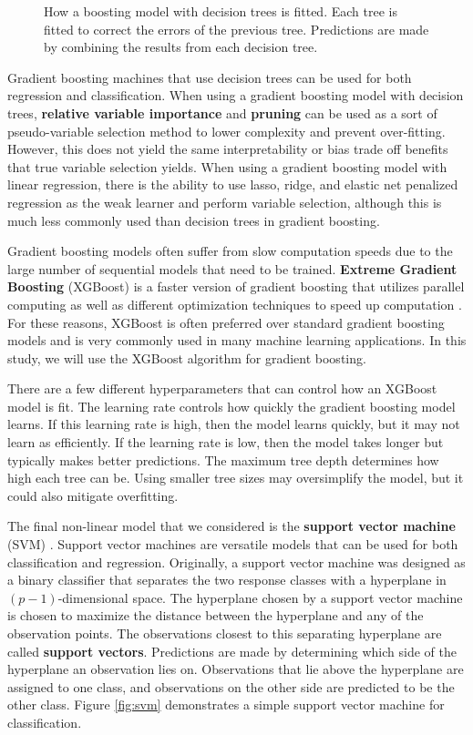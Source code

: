 \documentclass{article}
\begin{document}
\begin{figure}[b!]
	\footnotesize
	\centering
	
	\captionsetup{width = 0.8\textwidth}
	\caption{How a boosting model with decision trees is fitted. Each tree is fitted to correct the errors of the previous tree. Predictions are made by combining the results from each decision tree.}
	\label{fig:boosting}
\end{figure}

Gradient boosting machines that use decision trees can be used for both regression and classification. When using a gradient boosting model with decision trees, \textbf{relative variable importance} and \textbf{pruning} can be used as a sort of pseudo-variable selection method to lower complexity and prevent over-fitting. However, this does not yield the same interpretability or bias trade off benefits that true variable selection yields. When using a gradient boosting model with linear regression, there is the ability to use lasso, ridge, and elastic net penalized regression as the weak learner and perform variable selection, although this is much less commonly used than decision trees in gradient boosting.

Gradient boosting models often suffer from slow computation speeds due to the large number of sequential models that need to be trained. \textbf{Extreme Gradient Boosting} (XGBoost) is a faster version of gradient boosting that utilizes parallel computing as well as different optimization techniques to speed up computation \cite{chen2016xgboost}. For these reasons, XGBoost is often preferred over standard gradient boosting models and is very commonly used in many machine learning applications. In this study, we will use the XGBoost algorithm for gradient boosting.

There are a few different hyperparameters that can control how an XGBoost model is fit. The learning rate controls how quickly the gradient boosting model learns. If this learning rate is high, then the model learns quickly, but it may not learn as efficiently. If the learning rate is low, then the model takes longer but typically makes better predictions. The maximum tree depth determines how high each tree can be. Using smaller tree sizes may oversimplify the model, but it could also mitigate overfitting.

The final non-linear model that we considered is the \textbf{support vector machine} (SVM) \cite{cortes1995support}. Support vector machines are versatile models that can be used for both classification and regression. Originally, a support vector machine was designed as a binary classifier that separates the two response classes with a hyperplane in $(p - 1)$-dimensional space. The hyperplane chosen by a support vector machine is chosen to maximize the distance between the hyperplane and any of the observation points. The observations closest to this separating hyperplane are called \textbf{support vectors}. Predictions are made by determining which side of the hyperplane an observation lies on. Observations that lie above the hyperplane are assigned to one class, and observations on the other side are predicted to be the other class. Figure \ref{fig:svm} demonstrates a simple support vector machine for classification.
\end{document}
